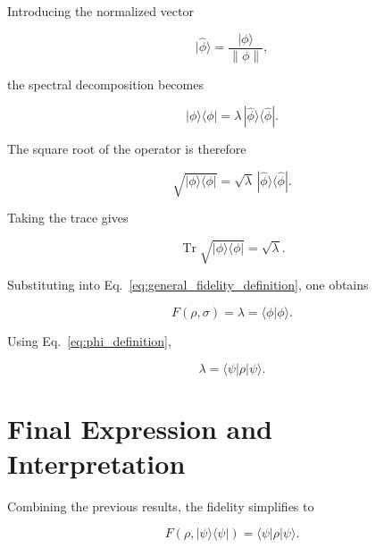 Introducing the normalized vector

\begin{equation}
|\hat{\phi}\rangle
=
\frac{|\phi\rangle}{\|\phi\|},
\label{eq:normalized_phi}
\end{equation}

the spectral decomposition becomes

\begin{equation}
|\phi\rangle\langle\phi|
=
\lambda\,
|\hat{\phi}\rangle\langle\hat{\phi}|.
\label{eq:spectral_decomposition_rank_one}
\end{equation}

The square root of the operator is therefore

\begin{equation}
\sqrt{
|\phi\rangle\langle\phi|
}
=
\sqrt{\lambda}\,
|\hat{\phi}\rangle\langle\hat{\phi}|.
\label{eq:square_root_rank_one}
\end{equation}

Taking the trace gives

\begin{equation}
\operatorname{Tr}
\sqrt{
|\phi\rangle\langle\phi|
}
=
\sqrt{\lambda}.
\label{eq:trace_square_root_rank_one}
\end{equation}

Substituting into Eq.~\eqref{eq:general_fidelity_definition}, one obtains

\begin{equation}
F(\rho,\sigma)
=
\lambda
=
\langle \phi | \phi \rangle.
\label{eq:fidelity_lambda_relation}
\end{equation}

Using Eq.~\eqref{eq:phi_definition},

\begin{equation}
\lambda
=
\langle \psi |
\rho
|\psi\rangle.
\label{eq:lambda_final_expression}
\end{equation}


\section*{Final Expression and Interpretation}

Combining the previous results, the fidelity simplifies to

\begin{equation}
F(\rho,|\psi\rangle\langle\psi|)
=
\langle \psi |
\rho
|\psi\rangle.
\label{eq:fidelity_pure_reference_final}
\end{equation}

